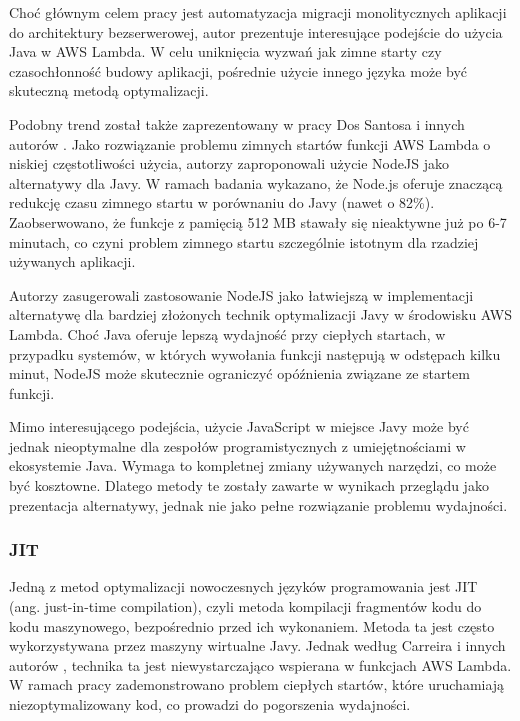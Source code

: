 Choć głównym celem pracy jest automatyzacja migracji monolitycznych aplikacji do architektury bezserwerowej, autor prezentuje interesujące podejście do użycia Java w AWS Lambda.
W celu uniknięcia wyzwań jak zimne starty czy czasochłonność budowy aplikacji, pośrednie użycie innego języka może być skuteczną metodą optymalizacji.

Podobny trend został także zaprezentowany w pracy Dos Santosa i innych autorów \cite{FerreiraDosSantos2023}.
Jako rozwiązanie problemu zimnych startów funkcji AWS Lambda o niskiej częstotliwości użycia, autorzy zaproponowali użycie NodeJS jako alternatywy dla Javy.
W ramach badania wykazano, że Node.js oferuje znaczącą redukcję czasu zimnego startu w porównaniu do Javy (nawet o 82\%). 
Zaobserwowano, że funkcje z pamięcią 512 MB stawały się nieaktywne już po 6-7 minutach, co czyni problem zimnego startu szczególnie istotnym dla rzadziej używanych aplikacji.

Autorzy zasugerowali zastosowanie NodeJS jako łatwiejszą w implementacji alternatywę dla bardziej złożonych technik optymalizacji Javy w środowisku AWS Lambda. 
Choć Java oferuje lepszą wydajność przy ciepłych startach, w przypadku systemów, w których wywołania funkcji następują w odstępach kilku minut, NodeJS może skutecznie ograniczyć opóźnienia związane ze startem funkcji.

Mimo interesującego podejścia, użycie JavaScript w miejsce Javy może być jednak nieoptymalne dla zespołów programistycznych z umiejętnościami w ekosystemie Java. 
Wymaga to kompletnej zmiany używanych narzędzi, co może być kosztowne. Dlatego metody te zostały zawarte w wynikach przeglądu jako prezentacja alternatywy, jednak nie jako pełne rozwiązanie problemu wydajności.

\subsubsection*{JIT}

Jedną z metod optymalizacji nowoczesnych języków programowania jest JIT (ang. just-in-time compilation), czyli metoda kompilacji fragmentów kodu do kodu maszynowego, bezpośrednio przed ich wykonaniem.
Metoda ta jest często wykorzystywana przez maszyny wirtualne Javy. Jednak według Carreira i innych autorów \cite{10.1145/3458336.3465305}, technika ta jest niewystarczająco wspierana w funkcjach AWS Lambda.
W ramach pracy zademonstrowano problem ciepłych startów, które uruchamiają niezoptymalizowany kod, co prowadzi do pogorszenia wydajności.

